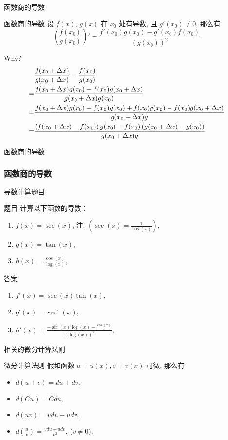 \documentclass[
10pt,
aspectratio=43,
]{beamer}
\begin{document}
\begin{frame}{函数商的导数}
	\begin{block}{函数商的导数}
		设 $f(x)$, $g(x)$ 在 $x_0$ 处有导数, 且 $g'(x_0)\neq 0$, 那么有
		\[
			\left(\frac{f(x_0)}{g(x_0)}\right)' = \frac{f'(x_0)g(x_0)-g'(x_0)f(x_0)}{(g(x_0))^2}
		\]
	\end{block}
	Why?
	\begin{align*}
		  & \frac{f(x_0+\Delta x)}{g(x_0+\Delta x)}-\frac{f(x_0)}{g(x_0)}                                                \\\bigskip
		= & \frac{f(x_0+\Delta x)g(x_0)-f(x_0)g(x_0+\Delta x)}{g(x_0+\Delta x)g(x_0)}                                    \\\bigskip
		= & \frac{f(x_0+\Delta x)g(x_0)-f(x_0)g(x_0)+f(x_0)g(x_0)-f(x_0)g(x_0+\Delta x)}{g(x_0+\Delta x)g}               \\\bigskip
		= & \frac{\left(f(x_0+\Delta x)-f(x_0)\right)g(x_0)-f(x_0)\left(g(x_0+\Delta x)-g(x_0)\right)}{g(x_0+\Delta x)g}
	\end{align*}
\end{frame}

\begin{frame}{函数商的导数}
	\frametitle{函数商的导数}{导数计算题目}
	\begin{exampleblock}{题目}
		计算以下函数的导数：
		\begin{enumerate}
			\item $f(x) = \sec(x)$, 注: $\left(\sec(x)=\displaystyle\frac{1}{\cos(x)}\right),$
			\item $g(x) = \tan(x)$,
			\item $h(x) = \displaystyle\frac{\cos(x)}{\log(x)}$,
		\end{enumerate}
	\end{exampleblock}

	\pause

	\begin{exampleblock}{答案}
		\begin{enumerate}
			\item $f'(x) = \sec(x) \tan(x)$,
			\item $g'(x) = \sec^2(x)$,
			\item $h'(x) = \displaystyle\frac{-\sin(x)\log(x)-\displaystyle\frac{\cos(x)}{x}}{(\log(x))^2}$,
		\end{enumerate}
	\end{exampleblock}
\end{frame}

\begin{frame}{相关的微分计算法则}
	\begin{alertblock}{微分计算法则}
		假如函数 $u=u(x), v=v(x)$ 可微, 那么有
		\begin{itemize}
			\item $d(u \pm v) = du \pm dv$,
			\item $d(Cu) = C du$,
			\item $d(uv) = v du + u dv$,
			\item $\displaystyle d\left(\frac{u}{v}\right) = \frac{v du - u dv}{v^2}$, ($v \neq 0$).
		\end{itemize}
	\end{alertblock}
\end{frame}
\end{document}
